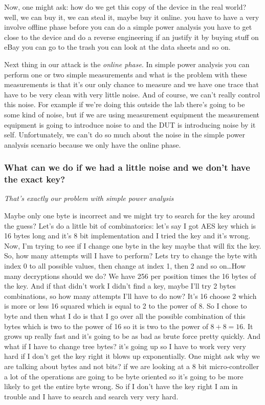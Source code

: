 Now, one might ask: how do we get this copy of the device in the real world?
well, we can buy it, we can steal it, maybe buy it online. you have to have a
very involve offline phase before you can do a simple power analysis you have to
get close to the device and do a reverse engineering if an justify it by buying
stuff on eBay you can go to the trash you can look at the data sheets and so on.

Next thing in our attack is the \textit{online phase}. In simple power analysis
you can perform one or two simple measurements and what is the problem with
these measurements  is that it's our only chance to measure and we have one
trace that have to be very clean with very little noise. And of course, we can't
really control this noise. For example if we're doing this outside the lab
there's going to be some kind of noise, but if we are using measurement
equipment the measurement equipment is going to introduce noise to and the DUT
is introducing noise by it self. Unfortunately, we can't do so much about the
noise in the simple power analysis scenario because we only have the online
phase.

\subsubsection{What can we do if we had a little noise and we don't have the exact key?}

\textit{That's exactly our problem with simple power analysis}

Maybe only one byte is incorrect and we might try to search for the key around
the guess? Let's do a little bit of combinatorics: let's say I got AES key which
is 16 bytes long and it's 8 bit implementation and I tried the key and it's
wrong. Now, I'm trying to see if I change one byte in the key maybe that will
fix the key. So, how many attempts will I have to perform? Lets try to change
the byte with index 0 to all possible values, then change at index 1, then 2 and
so on\ldots How many decryptions should we do? We have 256 per position
times the 16 bytes of the key. And if that didn't work I didn't find a key,
maybe I'll try 2 bytes combinations, so how many attempts I'll have to do now?
It's 16 choose 2 which is more or less 16 squared which is equal to 2 to the power of 8.
So I chose to byte and then what I do is that I go over all the
possible combination of this bytes which is two to the power of 16 so it is two
to the power of $8+8=16$. It grows up really fast and it's going to be as bad as
brute force pretty quickly. And what if I have to change tree bytes? it's going
up so I have to work very very hard if I don't get the key right it blows up
exponentially. One might ask why we are talking about bytes and not bits? if we
are looking at a 8 bit micro-controller a lot of the operations are going to be
byte oriented so it's going to be more likely to get the entire byte wrong. So
if I don't have the key right I am in trouble and I have to search and search
very very hard. 

